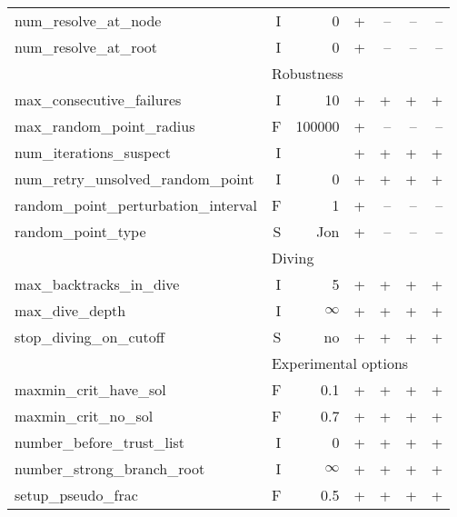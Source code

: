 \begin{center}
\begin{tabular}{|l|r|r|r|r|r|r|}
num\_resolve\_at\_node& I& 0& +& --& --& --\\
num\_resolve\_at\_root& I& 0& +& --& --& --\\
\hline
\multicolumn{1}{|c}{} & \multicolumn{6}{l|}{Robustness}\\
\hline
max\_consecutive\_failures& I& 10& +& +& +& +\\
max\_random\_point\_radius& F& 100000& +& --& --& --\\
num\_iterations\_suspect& I& \-1& +& +& +& +\\
num\_retry\_unsolved\_random\_point& I& 0& +& +& +& +\\
random\_point\_perturbation\_interval& F& 1& +& --& --& --\\
random\_point\_type& S& Jon& +& --& --& --\\
\hline
\multicolumn{1}{|c}{} & \multicolumn{6}{l|}{Diving}\\
\hline
max\_backtracks\_in\_dive& I& 5& +& +& +& +\\
max\_dive\_depth& I& $\infty$& +& +& +& +\\
stop\_diving\_on\_cutoff& S& no& +& +& +& +\\
\hline
\multicolumn{1}{|c}{} & \multicolumn{6}{l|}{Experimental options}\\
\hline
maxmin\_crit\_have\_sol& F& 0.1& +& +& +& +\\
maxmin\_crit\_no\_sol& F& 0.7& +& +& +& +\\
number\_before\_trust\_list& I& 0& +& +& +& +\\
number\_strong\_branch\_root& I& $\infty$& +& +& +& +\\
setup\_pseudo\_frac& F& 0.5& +& +& +& +\\
\hline
\end{tabular}
\end{center}



